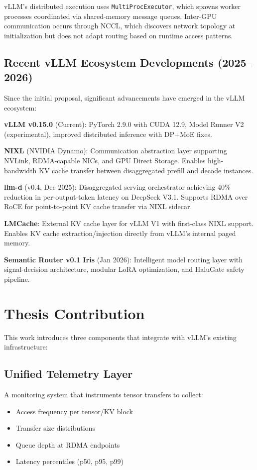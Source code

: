 \documentclass[10pt,letterpaper]{article}
\begin{document}
vLLM's distributed execution uses \texttt{MultiProcExecutor}, which spawns worker processes coordinated via shared-memory message queues. Inter-GPU communication occurs through NCCL, which discovers network topology at initialization but does not adapt routing based on runtime access patterns.

\subsection{Recent vLLM Ecosystem Developments (2025--2026)}

Since the initial proposal, significant advancements have emerged in the vLLM ecosystem:

\textbf{vLLM v0.15.0} (Current): PyTorch 2.9.0 with CUDA 12.9, Model Runner V2 (experimental), improved distributed inference with DP+MoE fixes.

\textbf{NIXL} (NVIDIA Dynamo): Communication abstraction layer supporting NVLink, RDMA-capable NICs, and GPU Direct Storage. Enables high-bandwidth KV cache transfer between disaggregated prefill and decode instances.

\textbf{llm-d} (v0.4, Dec 2025): Disaggregated serving orchestrator achieving 40\% reduction in per-output-token latency on DeepSeek V3.1. Supports RDMA over RoCE for point-to-point KV cache transfer via NIXL sidecar.

\textbf{LMCache}: External KV cache layer for vLLM V1 with first-class NIXL support. Enables KV cache extraction/injection directly from vLLM's internal paged memory.

\textbf{Semantic Router v0.1 Iris} (Jan 2026): Intelligent model routing layer with signal-decision architecture, modular LoRA optimization, and HaluGate safety pipeline.

\section{Thesis Contribution}

This work introduces three components that integrate with vLLM's existing infrastructure:

\subsection{Unified Telemetry Layer}
A monitoring system that instruments tensor transfers to collect:
\begin{itemize}[noitemsep]
    \item Access frequency per tensor/KV block
    \item Transfer size distributions
    \item Queue depth at RDMA endpoints
    \item Latency percentiles (p50, p95, p99)
\end{itemize}
\end{document}
